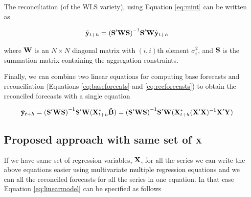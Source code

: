 \documentclass[11pt,a4paper,]{article}
\begin{document}
The reconciliation (of the WLS variety), using Equation \eqref{eq:mint}
can be written as

\begin{equation}\label{eq:recforecasts}
{\tilde{\bf y}}_{t+h} = {(\bf S'WS)}^{-1}{\bf S'W} {\hat{\bf y}_{t+h}}
\end{equation}

where \(\bf W\) is an \(N\times N\) diagonal matrix with \((i,i)\)th
element \(\sigma_i^2\), and \(\bf S\) is the summation matrix containing
the aggregation constraints.

Finally, we can combine two linear equations for computing base
forecasts and reconciliation (Equations \eqref{eq:baseforecats} and
\eqref{eq:recforecasts}) to obtain the reconciled forecasts with a single
equation

\begin{equation}\label{eq:singlestep}
{\tilde{\bf y}}_{t+h} = {(\bf S'WS)}^{-1}{\bf S'W} 
                        ({\bf X}_{t+h}^* {\bf \hat B}) 
                        = {(\bf S'WS)}^{-1}{\bf S'W} 
                        ({\bf X}_{t+h}^* ({\bf X' X})^{-1} {\bf X' Y})
\end{equation}

\subsection{\texorpdfstring{Proposed approach with same set of
\(\bf {X}\)}{Proposed approach with same set of \textbackslash{}bf \{X\}}}\label{proposed-approach-with-same-set-of-bf-x}

If we have same set of regression variables, \(\bf {X}\), for all the
series we can write the above equations easier using multivariate
multiple regression equations and we can all the reconciled forecasts
for all the series in one equation. In that case Equation
\eqref{eq:linearmodel} can be specified as follows
\end{document}
